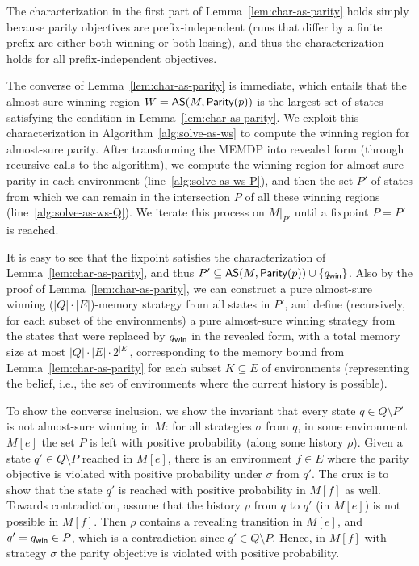\documentclass[a4paper,USenglish,cleveref, autoref, thm-restate]{lipics-v2021}
\def\abs#1{\ensuremath{\lvert #1 \rvert}}
\newcommand\restr[2]{\ensuremath{\left.#1\right\rvert_{#2}}}
\newcommand\almostsure{\textrm{\sf AS}}
\newcommand\Parity{\textrm{\sf Parity}}
\def\winabsorb{q_{\sf win}}
\begin{document}
The characterization in the first part of Lemma~\ref{lem:char-as-parity} 
holds simply because parity objectives are prefix-independent (runs that differ
by a finite prefix are either both winning or both losing), and thus the 
characterization holds for all prefix-independent objectives.


The converse of Lemma~\ref{lem:char-as-parity} is immediate, which entails
that the almost-sure winning region $W = \almostsure(M, \Parity(p))$ is the largest
set of states satisfying the condition in Lemma~\ref{lem:char-as-parity}.
We exploit this characterization in Algorithm~\ref{alg:solve-as-ws} to compute
the winning region for almost-sure parity. After transforming the MEMDP into
revealed form (through recursive calls to the algorithm), we compute 
the winning region for almost-sure parity in each environment (line~\ref{alg:solve-as-ws-P}), 
and then the set $P'$ of states from which we can remain in the intersection $P$ of all these winning regions
(line~\ref{alg:solve-as-ws-Q}). We iterate this process on $\restr{M}{P'}$
until a fixpoint $P=P'$ is reached. 

It is easy to see that the fixpoint satisfies the characterization 
of Lemma~\ref{lem:char-as-parity}, and thus 
$P' \subseteq \almostsure(M,\Parity(p)) \cup \{\winabsorb\}$.
Also by the proof of Lemma~\ref{lem:char-as-parity}, we can construct a pure almost-sure winning ($\abs{Q}\cdot\abs{E}$)-memory strategy from all states in $P'$, and define (recursively, for each subset of the environments) a pure almost-sure winning strategy from the states that were replaced by $\winabsorb$ in the revealed form, with a total memory size at most $\abs{Q}\cdot\abs{E} \cdot 2^{\abs{E}}$,
corresponding to the memory bound
from Lemma~\ref{lem:char-as-parity}
for each subset $K \subseteq E$ of environments (representing the belief, i.e., the set of environments where the current history is possible).



To show the converse inclusion, we show the invariant that
every state $q \in Q \setminus P'$ is not almost-sure winning in $M$:
for all strategies $\sigma$ from $q$, in some environment $M[e]$ the set $P$ is left 
with positive probability (along some history $\rho$). Given a state $q' \in Q \setminus P$ reached in $M[e]$,
there is an environment $f \in E$ where the parity objective is violated
with positive probability under $\sigma$ from $q'$.  The crux is to show that 
the state $q'$ is reached with positive probability
in $M[f]$ as well.
Towards contradiction, assume that the history $\rho$ from $q$ to $q'$ (in $M[e]$)
is not possible in $M[f]$. Then $\rho$ contains a revealing transition in $M[e]$,
and $q' = \winabsorb \in P$, which is a contradiction since $q' \in Q \setminus P$. 
Hence, in $M[f]$ with strategy $\sigma$ the parity objective is violated
with positive probability.
\end{document}
